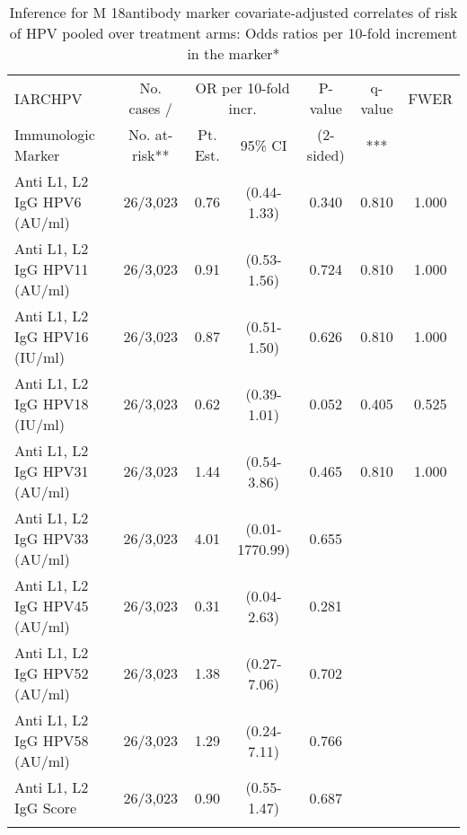 \begin{longtable}{lcccccc}
\caption{Inference for M 18antibody marker covariate-adjusted correlates of risk of HPV pooled over treatment arms: Odds ratios per 10-fold increment in the marker*} \\ 
   \hline
 
         \multicolumn{1}{l}{IARCHPV} & \multicolumn{1}{c}{No. cases /}   & \multicolumn{2}{c}{OR per 10-fold incr.}                     & \multicolumn{1}{c}{P-value}   & \multicolumn{1}{c}{q-value}   & \multicolumn{1}{c}{FWER} \\ 
         \multicolumn{1}{l}{Immunologic Marker}            & \multicolumn{1}{c}{No. at-risk**} & \multicolumn{1}{c}{Pt. Est.} & \multicolumn{1}{c}{95\% CI} & \multicolumn{1}{c}{(2-sided)} & \multicolumn{1}{c}{***} & \multicolumn{1}{c}{} \\ 
         \hline
 
    Anti L1, L2 IgG HPV6 (AU/ml) & 26/3,023 & 0.76 & (0.44-1.33) & 0.340 & 0.810 & 1.000 \\ 
  Anti L1, L2 IgG HPV11 (AU/ml) & 26/3,023 & 0.91 & (0.53-1.56) & 0.724 & 0.810 & 1.000 \\ 
  Anti L1, L2 IgG HPV16 (IU/ml) & 26/3,023 & 0.87 & (0.51-1.50) & 0.626 & 0.810 & 1.000 \\ 
  Anti L1, L2 IgG HPV18 (IU/ml) & 26/3,023 & 0.62 & (0.39-1.01) & 0.052 & 0.405 & 0.525 \\ 
  Anti L1, L2 IgG HPV31 (AU/ml) & 26/3,023 & 1.44 & (0.54-3.86) & 0.465 & 0.810 & 1.000 \\ 
  Anti L1, L2 IgG HPV33 (AU/ml) & 26/3,023 & 4.01 & (0.01-1770.99) & 0.655 &     &     \\ 
  Anti L1, L2 IgG HPV45 (AU/ml) & 26/3,023 & 0.31 & (0.04-2.63) & 0.281 &     &     \\ 
  Anti L1, L2 IgG HPV52 (AU/ml) & 26/3,023 & 1.38 & (0.27-7.06) & 0.702 &     &     \\ 
  Anti L1, L2 IgG HPV58 (AU/ml) & 26/3,023 & 1.29 & (0.24-7.11) & 0.766 &     &     \\ 
  Anti L1, L2 IgG Score & 26/3,023 & 0.90 & (0.55-1.47) & 0.687 &     &     \\ 
   \hline
\hline
\label{tab:CoR_univariable_logistic_pretty}
\end{longtable}

